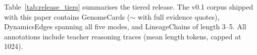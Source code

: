 Table~\ref{tab:release_tiers} summarises the tiered release. The v0.1
corpus shipped with this paper contains  GenomeCards
($\sim$ with full evidence quotes),  DynamicsEdges
spanning all five modes, and  LineageChains of length 3--5.
All annotations include teacher reasoning traces (mean length
 tokens, capped at 1024).

